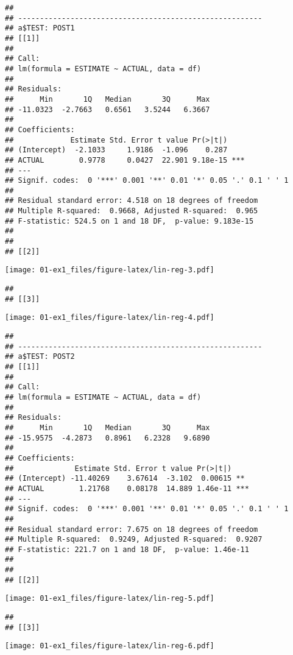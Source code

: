 \documentclass[]{book}
\begin{document}
\begin{verbatim}
## 
## -------------------------------------------------------- 
## a$TEST: POST1
## [[1]]
## 
## Call:
## lm(formula = ESTIMATE ~ ACTUAL, data = df)
## 
## Residuals:
##      Min       1Q   Median       3Q      Max 
## -11.0323  -2.7663   0.6561   3.5244   6.3667 
## 
## Coefficients:
##             Estimate Std. Error t value Pr(>|t|)    
## (Intercept)  -2.1033     1.9186  -1.096    0.287    
## ACTUAL        0.9778     0.0427  22.901 9.18e-15 ***
## ---
## Signif. codes:  0 '***' 0.001 '**' 0.01 '*' 0.05 '.' 0.1 ' ' 1
## 
## Residual standard error: 4.518 on 18 degrees of freedom
## Multiple R-squared:  0.9668, Adjusted R-squared:  0.965 
## F-statistic: 524.5 on 1 and 18 DF,  p-value: 9.183e-15
## 
## 
## [[2]]
\end{verbatim}

\texttt{[image: 01-ex1\_files/figure-latex/lin-reg-3.pdf]}

\begin{verbatim}
## 
## [[3]]
\end{verbatim}

\texttt{[image: 01-ex1\_files/figure-latex/lin-reg-4.pdf]}

\begin{verbatim}
## 
## -------------------------------------------------------- 
## a$TEST: POST2
## [[1]]
## 
## Call:
## lm(formula = ESTIMATE ~ ACTUAL, data = df)
## 
## Residuals:
##      Min       1Q   Median       3Q      Max 
## -15.9575  -4.2873   0.8961   6.2328   9.6890 
## 
## Coefficients:
##              Estimate Std. Error t value Pr(>|t|)    
## (Intercept) -11.40269    3.67614  -3.102  0.00615 ** 
## ACTUAL        1.21768    0.08178  14.889 1.46e-11 ***
## ---
## Signif. codes:  0 '***' 0.001 '**' 0.01 '*' 0.05 '.' 0.1 ' ' 1
## 
## Residual standard error: 7.675 on 18 degrees of freedom
## Multiple R-squared:  0.9249, Adjusted R-squared:  0.9207 
## F-statistic: 221.7 on 1 and 18 DF,  p-value: 1.46e-11
## 
## 
## [[2]]
\end{verbatim}

\texttt{[image: 01-ex1\_files/figure-latex/lin-reg-5.pdf]}

\begin{verbatim}
## 
## [[3]]
\end{verbatim}

\texttt{[image: 01-ex1\_files/figure-latex/lin-reg-6.pdf]}
\end{document}
